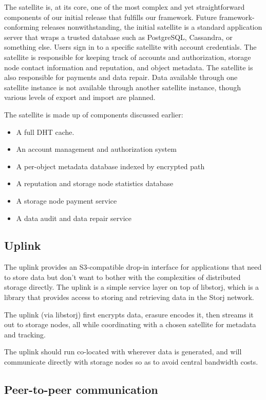\documentclass[a4paper,10pt]{article} \usepackage[utf8]{inputenc}
\begin{document}
The satellite is, at its core, one of the most complex and yet
straightforward components of our initial release that fulfills our framework.
Future framework-conforming releases nonwithstanding, the initial satellite
is a standard application server that wraps a trusted database such as
PostgreSQL, Cassandra, or something else. Users sign in to a specific
satellite with account credentials. The satellite is responsible for
keeping track of accounts and authorization, storage node contact information
and
reputation, and object metadata. The satellite is also responsible for
payments and data repair. Data available through one satellite instance is
not available through another satellite instance, though various levels of
export and import are planned.

The satellite is made up of components discussed earlier:

\begin{itemize}
\item A full DHT cache.
\item An account management and authorization system
\item A per-object metadata database indexed by encrypted path
\item A reputation and storage node statistics database
\item A storage node payment service
\item A data audit and data repair service
\end{itemize}

\subsection{Uplink}

The uplink provides an S3-compatible drop-in interface for applications that
need to store data but don't want to bother with the complexities of distributed
storage directly. The uplink is a simple service layer on top of libstorj,
which is a library that provides access to storing and retrieving data in the
Storj network.

The uplink (via libstorj) first encrypts data, erasure encodes it, then
streams it out to storage nodes, all while coordinating with a chosen satellite
for metadata and tracking.

The uplink should run co-located with wherever data is generated, and will
communicate directly with storage nodes so as to avoid central bandwidth costs.

\subsection{Peer-to-peer communication}
\end{document}
